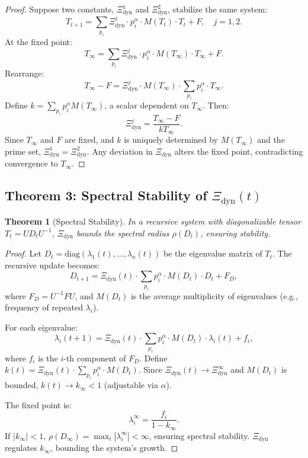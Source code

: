 \documentclass[12pt]{article}
\newtheorem{theorem}{Theorem}[section]
\begin{document}
\begin{proof}
Suppose two constants, $\Xi_{\text{dyn}}^1$ and $\Xi_{\text{dyn}}^2$, stabilize the same system:
\[
T_{t+1} = \sum_{p_i} \Xi_{\text{dyn}}^j \cdot p_i^\alpha \cdot M(T_t) \cdot T_t + F, \quad j = 1, 2.
\]
At the fixed point:
\[
T_\infty = \sum_{p_i} \Xi_{\text{dyn}}^j \cdot p_i^\alpha \cdot M(T_\infty) \cdot T_\infty + F.
\]
Rearrange:
\[
T_\infty - F = \Xi_{\text{dyn}}^j \cdot M(T_\infty) \cdot \sum_{p_i} p_i^\alpha \cdot T_\infty.
\]
Define \( k = \sum_{p_i} p_i^\alpha M(T_\infty) \), a scalar dependent on \( T_\infty \). Then:
\[
\Xi_{\text{dyn}}^j = \frac{T_\infty - F}{k T_\infty}.
\]
Since \( T_\infty \) and \( F \) are fixed, and \( k \) is uniquely determined by \( M(T_\infty) \) and the prime set, $\Xi_{\text{dyn}}^1 = \Xi_{\text{dyn}}^2$. Any deviation in $\Xi_{\text{dyn}}$ alters the fixed point, contradicting convergence to \( T_\infty \).
\end{proof}

\subsection{Theorem 3: Spectral Stability of $\Xi_{\text{dyn}}(t)$}
\begin{theorem}[Spectral Stability]
In a recursive system with diagonalizable tensor \( T_t = U D_t U^{-1} \), $\Xi_{\text{dyn}}$ bounds the spectral radius $\rho(D_t)$, ensuring stability.
\end{theorem}

\begin{proof}
Let \( D_t = \text{diag}(\lambda_1(t), \ldots, \lambda_n(t)) \) be the eigenvalue matrix of \( T_t \). The recursive update becomes:
\[
D_{t+1} = \Xi_{\text{dyn}}(t) \cdot \sum_{p_i} p_i^\alpha \cdot M(D_t) \cdot D_t + F_D,
\]
where \( F_D = U^{-1} F U \), and \( M(D_t) \) is the average multiplicity of eigenvalues (e.g., frequency of repeated $\lambda_i$).

For each eigenvalue:
\[
\lambda_i(t+1) = \Xi_{\text{dyn}}(t) \cdot \sum_{p_i} p_i^\alpha \cdot M(D_t) \cdot \lambda_i(t) + f_i,
\]
where \( f_i \) is the $i$-th component of \( F_D \). Define \( k(t) = \Xi_{\text{dyn}}(t) \cdot \sum_{p_i} p_i^\alpha \cdot M(D_t) \). Since \( \Xi_{\text{dyn}}(t) \to \Xi_{\text{dyn}}^\infty \) and \( M(D_t) \) is bounded, \( k(t) \to k_\infty < 1 \) (adjustable via $\alpha$).

The fixed point is:
\[
\lambda_i^\infty = \frac{f_i}{1 - k_\infty}.
\]
If \( |k_\infty| < 1 \), $\rho(D_\infty) = \max_i |\lambda_i^\infty| < \infty$, ensuring spectral stability. $\Xi_{\text{dyn}}$ regulates \( k_\infty \), bounding the system’s growth.
\end{proof}
\end{document}
